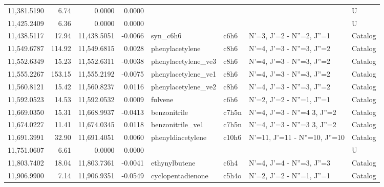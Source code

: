 \begin{longtable}{rrrrllll}
11,381.5190 &      6.74 &            0.0000 &    0.0000 &                             &         &                                      &          U \\
11,425.2409 &      6.36 &            0.0000 &    0.0000 &                             &         &                                      &          U \\
11,438.5117 &     17.94 &       11,438.5051 &   -0.0066 &                    syn_c6h6 &    c6h6 &            N'=3, J'=2 - N''=2, J''=1 &    Catalog \\
11,549.6787 &    114.92 &       11,549.6815 &    0.0028 &             phenylacetylene &    c8h6 &            N'=4, J'=3 - N''=3, J''=2 &    Catalog \\
11,552.6349 &     15.23 &       11,552.6311 &   -0.0038 &         phenylacetylene_ve3 &    c8h6 &            N'=4, J'=3 - N''=3, J''=2 &    Catalog \\
11,555.2267 &    153.15 &       11,555.2192 &   -0.0075 &         phenylacetylene_ve1 &    c8h6 &            N'=4, J'=3 - N''=3, J''=2 &    Catalog \\
11,560.8121 &     15.42 &       11,560.8237 &    0.0116 &         phenylacetylene_ve2 &    c8h6 &            N'=4, J'=3 - N''=3, J''=2 &    Catalog \\
11,592.0523 &     14.53 &       11,592.0532 &    0.0009 &                     fulvene &    c6h6 &            N'=2, J'=2 - N''=1, J''=1 &    Catalog \\
11,669.0350 &     15.31 &       11,668.9937 &   -0.0413 &                benzonitrile &   c7h5n &      N'=4, J'=3 - N''=4     3, J''=2 &    Catalog \\
11,674.0227 &     11.41 &       11,674.0345 &    0.0118 &            benzonitrile_ve1 &   c7h5n &      N'=4, J'=3 - N''=3     3, J''=2 &    Catalog \\
11,691.3991 &     32.90 &       11,691.4051 &    0.0060 &           phenyldiacetylene &   c10h6 &        N'=11, J'=11 - N''=10, J''=10 &    Catalog \\
11,751.0607 &      6.61 &            0.0000 &    0.0000 &                             &         &                                      &          U \\
11,803.7402 &     18.04 &       11,803.7361 &   -0.0041 &               ethynylbutene &    c6h4 &            N'=4, J'=4 - N''=3, J''=3 &    Catalog \\
11,906.9900 &      7.14 &       11,906.9351 &   -0.0549 &           cyclopentadienone &   c5h4o &            N'=2, J'=2 - N''=1, J''=1 &    Catalog \\

\end{longtable}
